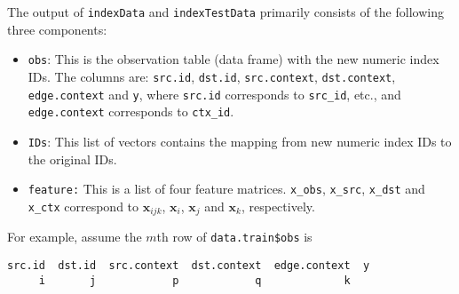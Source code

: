 \documentclass[10pt]{article}
\begin{document}
The output of {\tt indexData} and {\tt indexTestData} primarily consists of the following three components:
\begin{itemize}
\item {\tt obs}: This is the observation table (data frame) with the new numeric index IDs.  The columns are: {\tt src.id}, {\tt dst.id}, {\tt src.context}, {\tt dst.context}, {\tt edge.context} and {\tt y}, where {\tt src.id} corresponds to {\tt src\_id}, etc., and {\tt edge.context} corresponds to {\tt ctx\_id}.
\item {\tt IDs}: This list of vectors contains the mapping from new numeric index IDs to the original IDs.
\item {\tt feature:} This is a list of four feature matrices.  {\tt x\_obs}, {\tt x\_src}, {\tt x\_dst} and {\tt x\_ctx} correspond to $\bm{x}_{ijk}$, $\bm{x}_{i}$, $\bm{x}_{j}$ and $\bm{x}_{k}$, respectively.
\end{itemize}
For example, assume the $m$th row of {\tt data.train\$obs} is
{\small\begin{verbatim}
src.id  dst.id  src.context  dst.context  edge.context  y
     i       j            p            q             k  
\end{verbatim}}




\end{document}
